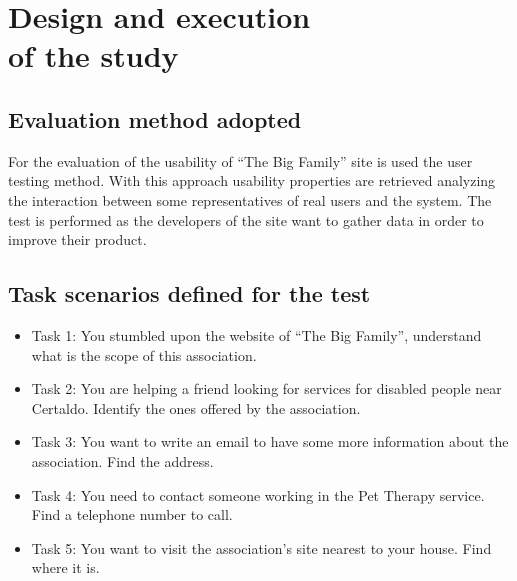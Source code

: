 %
%
\chapter{Design and execution\\of the study}
%
%
%
\section{Evaluation method adopted}
For the evaluation of the usability of ``The Big Family'' site is used the user testing method. With this approach usability properties are retrieved analyzing the interaction between some representatives of real users and the system. The test is performed as the developers of the site want to gather data in order to improve their product.
%
%
\section{Task scenarios defined for the test}
\begin{itemize}
\item Task 1: You stumbled upon the website of ``The Big Family'', understand what is the scope of this association.
\item Task 2: You are helping a friend looking for services for disabled people near Certaldo. Identify the ones offered by the association.
\item Task 3: You want to write an email to have some more information about the association. Find the address.
\item Task 4: You need to contact someone working in the Pet Therapy service. Find a telephone number to call.
\item Task 5: You want to visit the association's site nearest to your house. Find where it is.
\end{itemize}
%
%
